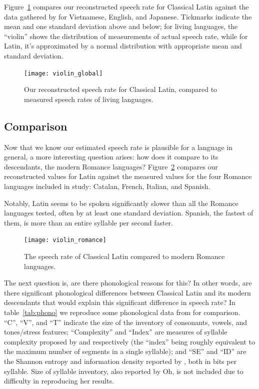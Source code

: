 \documentclass[12pt,twoside]{article}
\begin{document}
Figure~\ref{fig:violin1} compares our reconstructed speech rate for Classical Latin against the data gathered by \citet{coupé} for Vietnamese, English, and Japanese. Tickmarks indicate the mean and one standard deviation above and below; for living languages, the ``violin'' shows the distribution of measurements of actual speech rate, while for Latin, it's approximated by a normal distribution with appropriate mean and standard deviation.

\begin{figure}[p]
\centering
\caption{Our reconstructed speech rate for Classical Latin, compared to measured speech rates of living languages.}
\label{fig:violin1}
\noindent\texttt{[image: violin\_global]}
\end{figure}

\subsection{Comparison}

Now that we know our estimated speech rate is plausible for a language in general, a more interesting question arises: how does it compare to its descendants, the modern Romance languages? Figure~\ref{fig:violin2} compares our reconstructed values for Latin against the measured values for the four Romance languages included in  study: Catalan, French, Italian, and Spanish.

Notably, Latin seems to be spoken significantly slower than all the Romance languages tested, often by at least one standard deviation. Spanish, the fastest of them, is more than an entire syllable per second faster.

\begin{figure}[p]
\centering
\caption{The speech rate of Classical Latin compared to modern Romance languages.}
\label{fig:violin2}
\noindent\texttt{[image: violin\_romance]}
\end{figure}

The next question is, are there phonological reasons for this? In other words, are there significant phonological differences between Classical Latin and its modern descendants that would explain this significant difference in speech rate? In table~\ref{tab:phono} we reproduce some phonological data from \citet{oh} for comparison. ``C'', ``V'', and ``T'' indicate the size of the inventory of consonants, vowels, and tones/stress features; ``Complexity'' and ``Index'' are measures of syllable complexity proposed by \citet{wals} and \citet{lapsyd} respectively (the ``index'' being roughly equivalent to the maximum number of segments in a single syllable); and ``SE'' and ``ID'' are the Shannon entropy and information density reported by \citet{oh}, both in bits per syllable. Size of syllable inventory, also reported by Oh, is not included due to difficulty in reproducing her results.
\end{document}
